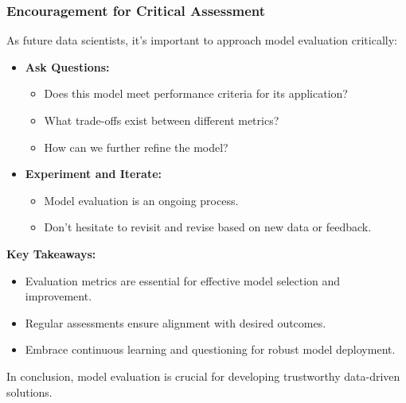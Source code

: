 \documentclass[aspectratio=169]{beamer}
\begin{document}
\begin{frame}[fragile]
    \frametitle{Encouragement for Critical Assessment}
    As future data scientists, it's important to approach model evaluation critically:
    \begin{itemize}
        \item \textbf{Ask Questions:} 
            \begin{itemize}
                \item Does this model meet performance criteria for its application?
                \item What trade-offs exist between different metrics?
                \item How can we further refine the model?
            \end{itemize}
        
        \item \textbf{Experiment and Iterate:} 
            \begin{itemize}
                \item Model evaluation is an ongoing process.
                \item Don't hesitate to revisit and revise based on new data or feedback.
            \end{itemize}
    \end{itemize}
    
    \textbf{Key Takeaways:}
    \begin{itemize}
        \item Evaluation metrics are essential for effective model selection and improvement.
        \item Regular assessments ensure alignment with desired outcomes.
        \item Embrace continuous learning and questioning for robust model deployment.
    \end{itemize}
    
    In conclusion, model evaluation is crucial for developing trustworthy data-driven solutions.
\end{frame}
\end{document}
